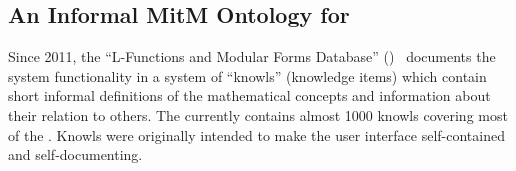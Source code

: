 %
%
%
%
%

\subsection{An Informal MitM Ontology for  \LMFDB}

Since 2011, the ``L-Functions and Modular Forms Database'' (\LMFDB)~\cite{Cremona:LMFDB16,lmfdb:on} documents the system functionality in a system of ``knowls'' (knowledge items) which contain short informal definitions of the mathematical concepts and information about their relation to others.
The \LMFDB currently contains almost 1000 knowls covering most of the \LMFDB.
Knowls were originally intended to make the \LMFDB user interface self-contained and self-documenting.

